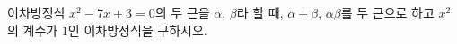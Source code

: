 이차방정식 $x^2-7x+3=0$의 두 근을 $\alpha$, $\beta$라 할 때, $\alpha+\beta$, $\alpha\beta$를 두 근으로 하고 $x^2$의 계수가 $1$인 이차방정식을 구하시오.

